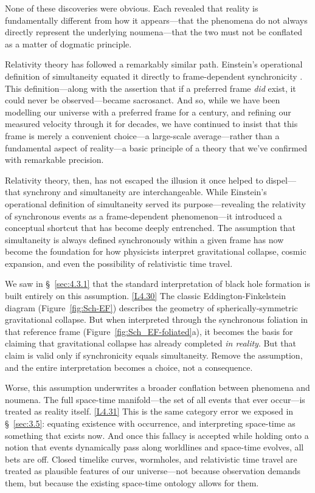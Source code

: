 \documentclass[12pt]{book}
\newcounter{logicanchor}
\newenvironment{logicanchorenv}[1]{\refstepcounter{logicanchor}\label{#1}}{}
\newcommand{\logiclink}[2]{\begin{logicanchorenv}{logic:#1}\end{logicanchorenv}\hyperref[appendix:#1]{[#1]}\xspace}
\begin{document}
None of these discoveries were obvious. Each revealed that reality is fundamentally different from how it appears---that the phenomena do not always directly represent the underlying noumena---that the two must not be conflated as a matter of dogmatic principle.

Relativity theory has followed a remarkably similar path. Einstein's operational definition of simultaneity equated it directly to frame-dependent synchronicity \cite{Einstein1905a,Einstein1952}. This definition---along with the assertion that if a preferred frame \textit{did} exist, it could never be observed---became sacrosanct. And so, while we have been modelling our universe with a preferred frame for a century, and refining our measured velocity through it for decades, we have continued to insist that this frame is merely a convenient choice---a large-scale average---rather than a fundamental aspect of reality---a basic principle of a theory that we've confirmed with remarkable precision.

Relativity theory, then, has not escaped the illusion it once helped to dispel---that synchrony and simultaneity are interchangeable. While Einstein's operational definition of simultaneity served its purpose---revealing the relativity of synchronous events as a frame-dependent phenomenon---it introduced a conceptual shortcut that has become deeply entrenched. The assumption that simultaneity is always defined synchronously within a given frame has now become the foundation for how physicists interpret gravitational collapse, cosmic expansion, and even the possibility of relativistic time travel.

We saw in \S~\ref{sec:4.3.1} that the standard interpretation of black hole formation is built entirely on this assumption. \logiclink{L4.30}{} The classic Eddington-Finkelstein diagram (Figure~\ref{fig:Sch-EF}) describes the geometry of spherically-symmetric gravitational collapse. But when interpreted through the synchronous foliation in that reference frame (Figure~\ref{fig:Sch_EF-foliated}a), it becomes the basis for claiming that gravitational collapse has already completed \textit{in reality}. But that claim is valid only if synchronicity equals simultaneity. Remove the assumption, and the entire interpretation becomes a choice, not a consequence.

Worse, this assumption underwrites a broader conflation between phenomena and noumena. The full space-time manifold---the set of all events that ever occur---is treated as reality itself. \logiclink{L4.31}{} This is the same category error we exposed in \S~\ref{sec:3.5}: equating existence with occurrence, and interpreting space-time as something that exists now. And once this fallacy is accepted while holding onto a notion that events dynamically pass along worldlines and space-time evolves, all bets are off. Closed timelike curves, wormholes, and relativistic time travel are treated as plausible features of our universe---not because observation demands them, but because the existing space-time ontology allows for them.
\end{document}
